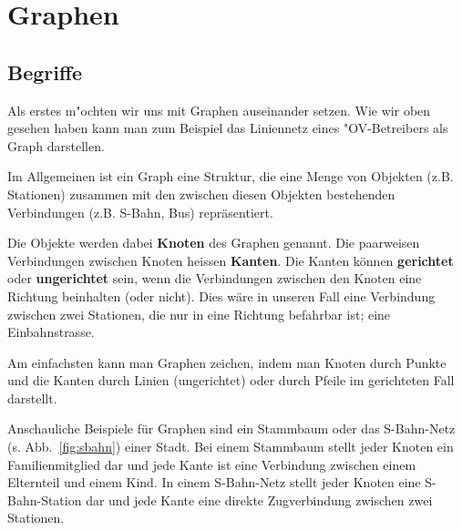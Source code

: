\section{Graphen}




\subsection{Begriffe}

Als erstes m"ochten wir uns mit Graphen auseinander setzen. 
Wie wir oben gesehen haben kann man zum Beispiel das Liniennetz eines "OV-Betreibers als Graph darstellen. 


Im Allgemeinen ist ein Graph eine Struktur, die eine Menge von Objekten (z.B. Stationen) zusammen mit den zwischen diesen Objekten bestehenden Verbindungen (z.B. S-Bahn, Bus) repräsentiert. 

Die Objekte werden dabei \textbf{Knoten} des Graphen genannt. 
Die paarweisen Verbindungen zwischen Knoten heissen \textbf{Kanten}. 
Die Kanten können \textbf{gerichtet} oder \textbf{ungerichtet} sein, wenn die Verbindungen zwischen den Knoten eine Richtung beinhalten (oder nicht).
Dies wäre in unseren Fall eine Verbindung zwischen zwei Stationen, die nur in eine Richtung befahrbar ist; eine Einbahnstrasse.

Am einfachsten kann man Graphen zeichen, indem man Knoten durch Punkte und die Kanten durch Linien (ungerichtet) oder durch Pfeile im gerichteten Fall darstellt. 

\begin{mbsp}
Anschauliche Beispiele für Graphen sind ein Stammbaum oder das S-Bahn-Netz (s. Abb.~\ref{fig:sbahn}) einer Stadt. 
Bei einem Stammbaum stellt jeder Knoten ein Familienmitglied dar und jede Kante ist eine Verbindung zwischen einem Elternteil und einem Kind. 
In einem S-Bahn-Netz stellt jeder Knoten eine S-Bahn-Station dar und jede Kante eine direkte Zugverbindung zwischen zwei Stationen.
\end{mbsp}
%
%


